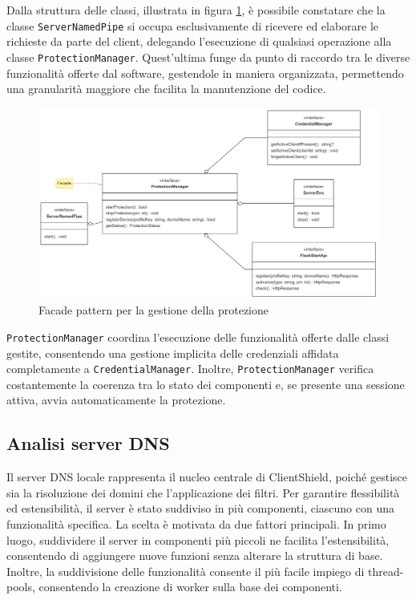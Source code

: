 \documentclass[12pt,a4paper,openright,twoside]{book}
\begin{document}
Dalla struttura delle classi, illustrata in figura \ref{fig:protezione-facade-pattern}, è possibile constatare che la classe \texttt{ServerNamedPipe} si occupa esclusivamente di ricevere ed elaborare le richieste da parte del client, delegando l'esecuzione di qualsiasi operazione alla classe \texttt{ProtectionManager}.
Quest'ultima funge da punto di raccordo tra le diverse funzionalità offerte dal software, gestendole in maniera organizzata, permettendo una granularità maggiore che facilita la manutenzione del codice.
\begin{figure}[h]
	\centering
	\includegraphics[width=1.0\textwidth]{figures/protezione-facade-pattern.png}
	\caption{Facade pattern per la gestione della protezione}
	\label{fig:protezione-facade-pattern}
\end{figure}
\texttt{ProtectionManager} coordina l'esecuzione delle funzionalità offerte dalle classi gestite, consentendo una gestione implicita delle credenziali affidata completamente a \texttt{CredentialManager}.
Inoltre, \texttt{ProtectionManager} verifica costantemente la coerenza tra lo stato dei componenti e, se presente una sessione attiva, avvia automaticamente la protezione.


\subsection{Analisi server DNS}
\label{ssec:analisi-server-dns}

Il server \gls{DNS} locale rappresenta il nucleo centrale di ClientShield, poiché gestisce sia la risoluzione dei domini che l'applicazione dei filtri.
Per garantire flessibilità ed estensibilità, il server è stato suddiviso in più componenti, ciascuno con una funzionalità specifica.
La scelta è motivata da due fattori principali.
In primo luogo, suddividere il server in componenti più piccoli ne facilita l'estensibilità, consentendo di aggiungere nuove funzioni senza alterare la struttura di base.
Inoltre, la suddivisione delle funzionalità consente il più facile impiego di thread-pools, consentendo la creazione di worker sulla base dei componenti.
\end{document}
